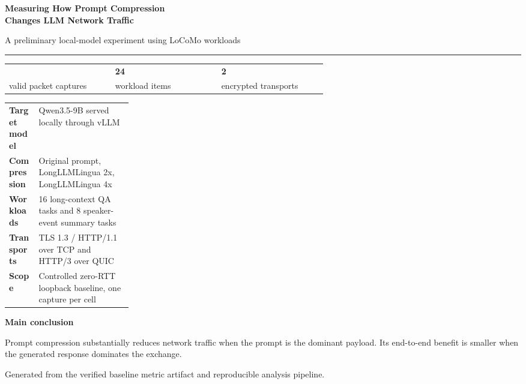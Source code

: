 \documentclass[10pt]{article}
\begin{document}
\begin{titlepage}
  \vspace*{0.55in}
  {\Huge\bfseries
   Measuring How Prompt Compression\\Changes LLM Network Traffic\par}
  \vspace{0.2in}
  {\Large A preliminary local-model experiment using LoCoMo workloads\par}
  \vspace{0.32in}
  {\color{ReportBlue}\rule{\linewidth}{1.5pt}}

  \vspace{0.35in}
  \begin{center}
  \begin{tabular}{>{\centering\arraybackslash}p{0.27\linewidth}
                  >{\centering\arraybackslash}p{0.27\linewidth}
                  >{\centering\arraybackslash}p{0.27\linewidth}}
    {\Huge\bfseries 144} &
    {\Huge\bfseries 24} &
    {\Huge\bfseries 2} \\
    valid packet captures & workload items & encrypted transports
  \end{tabular}
  \end{center}

  \vspace{0.35in}
  \begin{tabularx}{\linewidth}{@{}>{\bfseries}p{0.24\linewidth}Y@{}}
    Target model & Qwen3.5-9B served locally through vLLM \\
    Compression & Original prompt, LongLLMLingua 2x, LongLLMLingua 4x \\
    Workloads & 16 long-context QA tasks and 8 speaker-event summary tasks \\
    Transports & TLS 1.3 / HTTP/1.1 over TCP and HTTP/3 over QUIC \\
    Scope & Controlled zero-RTT loopback baseline, one capture per cell \\
  \end{tabularx}

  \vfill
  {\large\bfseries Main conclusion\par}
  \vspace{0.08in}
  Prompt compression substantially reduces network traffic when the prompt is
  the dominant payload. Its end-to-end benefit is smaller when the generated
  response dominates the exchange.

  \vspace{0.3in}
  {\small Generated from the verified baseline metric artifact and reproducible
  analysis pipeline.}
\end{titlepage}
\end{document}
